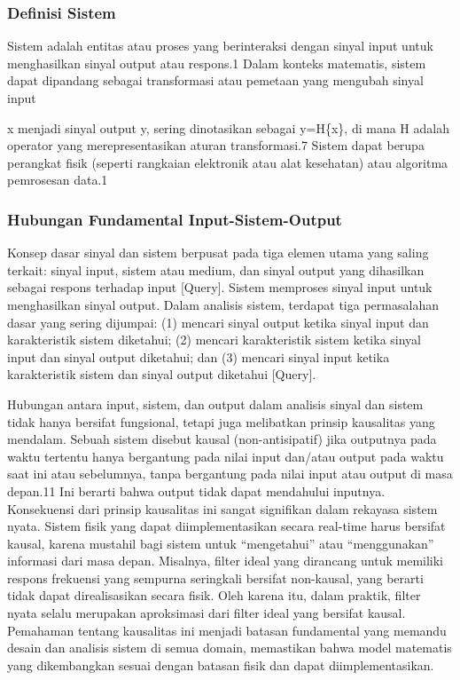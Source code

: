 \documentclass[
  letterpaper,
  DIV=11,
  numbers=noendperiod]{scrreprt}
\begin{document}
\subsubsection{Definisi Sistem}\label{definisi-sistem}

Sistem adalah entitas atau proses yang berinteraksi dengan sinyal input
untuk menghasilkan sinyal output atau respons.1 Dalam konteks matematis,
sistem dapat dipandang sebagai transformasi atau pemetaan yang mengubah
sinyal input

x menjadi sinyal output y, sering dinotasikan sebagai y=H\{x\}, di mana
H adalah operator yang merepresentasikan aturan transformasi.7 Sistem
dapat berupa perangkat fisik (seperti rangkaian elektronik atau alat
kesehatan) atau algoritma pemrosesan data.1

\subsubsection{Hubungan Fundamental
Input-Sistem-Output}\label{hubungan-fundamental-input-sistem-output}

Konsep dasar sinyal dan sistem berpusat pada tiga elemen utama yang
saling terkait: sinyal input, sistem atau medium, dan sinyal output yang
dihasilkan sebagai respons terhadap input {[}Query{]}. Sistem memproses
sinyal input untuk menghasilkan sinyal output. Dalam analisis sistem,
terdapat tiga permasalahan dasar yang sering dijumpai: (1) mencari
sinyal output ketika sinyal input dan karakteristik sistem diketahui;
(2) mencari karakteristik sistem ketika sinyal input dan sinyal output
diketahui; dan (3) mencari sinyal input ketika karakteristik sistem dan
sinyal output diketahui {[}Query{]}.

Hubungan antara input, sistem, dan output dalam analisis sinyal dan
sistem tidak hanya bersifat fungsional, tetapi juga melibatkan prinsip
kausalitas yang mendalam. Sebuah sistem disebut kausal (non-antisipatif)
jika outputnya pada waktu tertentu hanya bergantung pada nilai input
dan/atau output pada waktu saat ini atau sebelumnya, tanpa bergantung
pada nilai input atau output di masa depan.11 Ini berarti bahwa output
tidak dapat mendahului inputnya. Konsekuensi dari prinsip kausalitas ini
sangat signifikan dalam rekayasa sistem nyata. Sistem fisik yang dapat
diimplementasikan secara real-time harus bersifat kausal, karena
mustahil bagi sistem untuk ``mengetahui'' atau ``menggunakan'' informasi
dari masa depan. Misalnya, filter ideal yang dirancang untuk memiliki
respons frekuensi yang sempurna seringkali bersifat non-kausal, yang
berarti tidak dapat direalisasikan secara fisik. Oleh karena itu, dalam
praktik, filter nyata selalu merupakan aproksimasi dari filter ideal
yang bersifat kausal. Pemahaman tentang kausalitas ini menjadi batasan
fundamental yang memandu desain dan analisis sistem di semua domain,
memastikan bahwa model matematis yang dikembangkan sesuai dengan batasan
fisik dan dapat diimplementasikan.
\end{document}
